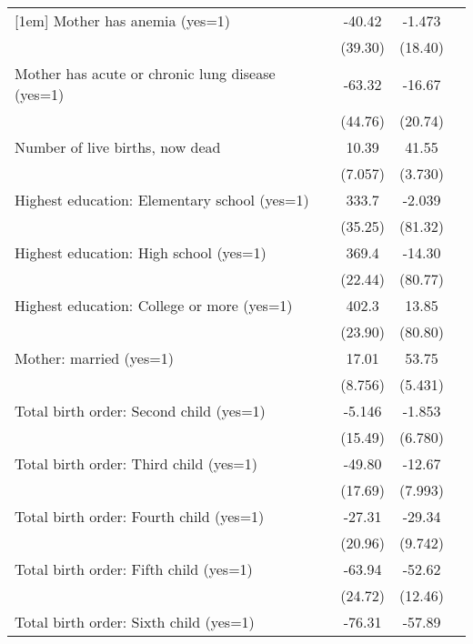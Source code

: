\begin{tabular}{l*{3}{c}}
[1em]
Mother has anemia (yes=1)&      -40.42&      -1.473&            \\
                    &     (39.30)&     (18.40)&            \\
[1em]
Mother has acute or chronic lung disease (yes=1)&      -63.32&      -16.67&            \\
                    &     (44.76)&     (20.74)&            \\
[1em]
Number of live births, now dead&       10.39&       41.55&            \\
                    &     (7.057)&     (3.730)&            \\
[1em]
Highest education: Elementary school (yes=1)&       333.7&      -2.039&            \\
                    &     (35.25)&     (81.32)&            \\
[1em]
Highest education: High school (yes=1)&       369.4&      -14.30&            \\
                    &     (22.44)&     (80.77)&            \\
[1em]
Highest education: College or more (yes=1)&       402.3&       13.85&            \\
                    &     (23.90)&     (80.80)&            \\
[1em]
Mother: married (yes=1)&       17.01&       53.75&            \\
                    &     (8.756)&     (5.431)&            \\
[1em]
Total birth order: Second child (yes=1)&      -5.146&      -1.853&            \\
                    &     (15.49)&     (6.780)&            \\
[1em]
Total birth order: Third child (yes=1)&      -49.80&      -12.67&            \\
                    &     (17.69)&     (7.993)&            \\
[1em]
Total birth order: Fourth child (yes=1)&      -27.31&      -29.34&            \\
                    &     (20.96)&     (9.742)&            \\
[1em]
Total birth order: Fifth child (yes=1)&      -63.94&      -52.62&            \\
                    &     (24.72)&     (12.46)&            \\
[1em]
Total birth order: Sixth child (yes=1)&      -76.31&      -57.89&            \\

\end{tabular}
